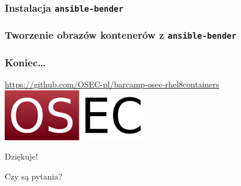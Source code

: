 \documentclass[dvipsnames,table]{beamer}
\begin{document}
\begin{frame}[fragile]
	\frametitle{Instalacja {\tt ansible-bender}}
%
\end{frame}

\begin{frame}[fragile]
	\frametitle{Tworzenie obrazów kontenerów z {\tt ansible-bender}}
%
\end{frame}

\begin{frame}
\frametitle{Koniec\ldots}
\begin{center}
\href{https://github.com/OSEC-pl/barcamp-osec-rhel8containers}{https://github.com/OSEC-pl/barcamp-osec-rhel8containers}
\includegraphics[scale=0.5]{img-oseclogo.png}

Dziękuje!

Czy są pytania?

\end{center}
\end{frame}
\end{document}

